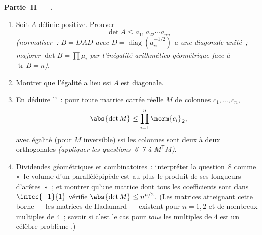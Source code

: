 \begin{problem}
\medskip
\noindent\textbf{Partie~II --- .}
\begin{enumerate}[resume]
  \item Soit $A$ définie positive. Prouver
        \[
        \det A \leq a_{11}\,a_{22}\cdots a_{nn}
        \]
        \emph{(normaliser~: $B = DAD$ avec $D =
        \operatorname{diag}(a_{ii}^{-1/2})$ a une diagonale unité~;
        majorer $\det B = \prod \mu_i$ par l'inégalité
        arithmético-géométrique face à $\operatorname{tr} B = n$)}.
  \item Montrer que l'égalité a lieu ssi $A$ est diagonale.
  \item En déduire l'\emph{}~: pour toute
        matrice carrée réelle $M$ de colonnes $c_1, \dots, c_n$,
        \[
        \abs{\det M} \leq \prod_{i=1}^{n}\norm{c_i}_2 ,
        \]
        avec égalité (pour $M$ inversible) ssi les colonnes sont
        deux à deux orthogonales \emph{(appliquer les questions~6--7
        à $M^{\mathsf T}M$)}.
  \item Dividendes géométriques et combinatoires~: interpréter la
        question~8 comme «~le volume d'un parallélépipède est au
        plus le produit de ses longueurs d'arêtes~»~; et montrer
        qu'une matrice dont tous les coefficients sont dans
        $\intcc{-1}{1}$ vérifie $\abs{\det M} \leq n^{n/2}$. (Les
        matrices atteignant cette borne --- les matrices de Hadamard
        --- existent pour $n = 1, 2$ et de nombreux multiples de
        $4$~; savoir si c'est le cas pour \emph{tous} les multiples
        de $4$ est un célèbre problème .)
\end{enumerate}


\end{problem}
